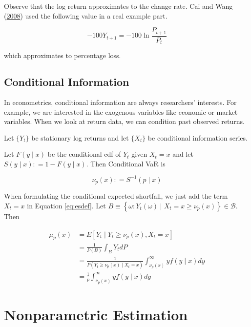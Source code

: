 \documentclass[
]{article}
\theoremstyle{definition}
\theoremstyle{definition}
\theoremstyle{definition}
\theoremstyle{remark}
\let\BeginKnitrBlock\begin \let\EndKnitrBlock\end
\begin{document}
Observe that the log return approximates to the change rate. Cai and Wang (\protect\hyperlink{ref-cai:2008aa}{2008}) used the following value in a real example part.

\[-100 Y_{t + 1} = -100 \ln \frac{P_{t + 1}}{P_t}\]

which approximates to percentage loss.

\hypertarget{conditional-information}{%
\subsection{Conditional Information}\label{conditional-information}}

In econometrics, conditional information are always researchers' interests. For example, we are interested in the exogenous variables like economic or market variables. When we look at return data, we can condition past observed returns.

Let \(\{ Y_t \}\) be stationary log returns and let \(\{ X_t \}\) be conditional information series.

\BeginKnitrBlock{definition}[Conditional Value-at-Risk]
\protect\hypertarget{def:condvar}{}{\label{def:condvar} \iffalse (Conditional Value-at-Risk) \fi{} }Let \(F(y \mid x)\) be the conditional cdf of \(Y_t\) given \(X_t = x\) and let \(S(y \mid x) \mathpunct{:}=1 - F(y \mid x)\). Then Conditional VaR is

\[\nu_p(x) \mathpunct{:}=S^{-1}(p \mid x)\]
\EndKnitrBlock{definition}

When formulating the conditional expected shortfall, we just add the term \(X_t = x\) in Equation \eqref{eq:esdef}. Let \(B \equiv \left\{ \omega \mathpunct{:} Y_t(\omega) \mid X_t = x \ge \nu_p(x) \right\} \in \mathcal{B}\). Then

\begin{equation}
  \begin{split}
    \mu_p(x) & = E \left[ Y_t \mid Y_t \ge \nu_p(x), X_t = x \right] \\
    & = \frac{1}{P(B)} \int_{B} Y_t dP \\
    & = \frac{1}{P\left( Y_t \ge \nu_p(x) \mid X_t = x \right)} \int_{\nu_p(x)}^\infty y f(y \mid x) dy \\
    & = \frac{1}{p} \int_{\nu_p(x)}^\infty y f(y \mid x) dy
  \end{split}
  \label{eq:cesformul}
\end{equation}

\hypertarget{nonparam}{%
\section{Nonparametric Estimation}\label{nonparam}}
\end{document}
